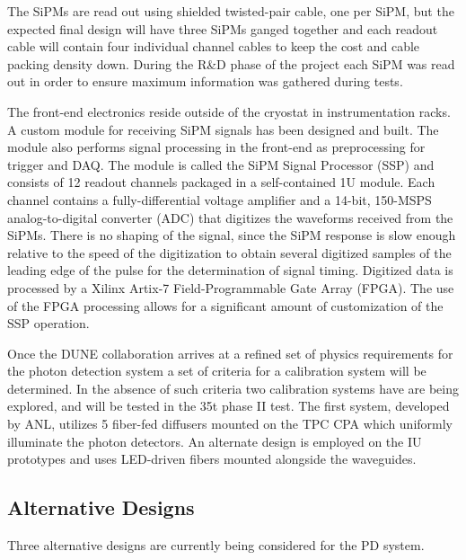 The SiPMs are read out using shielded twisted-pair cable, one per SiPM,
but the expected final design will have three SiPMs ganged together and
each readout cable will contain four individual channel cables to keep
the cost and cable packing density down. During the R\&D phase of the
project each SiPM was read out in order to ensure maximum information
was gathered during tests.  

The front-end electronics reside outside of the cryostat in
instrumentation racks. A custom module for receiving SiPM signals has
been designed and built. The module also performs signal processing in
the front-end as preprocessing for trigger and DAQ.  The module is
called the SiPM Signal Processor (SSP) and consists of 12 readout
channels packaged in a self-contained 1U module.  Each channel
contains a fully-differential voltage amplifier and a 14-bit, 150-MSPS
analog-to-digital converter (ADC) that digitizes the waveforms
received from the SiPMs. There is no shaping of the signal, since the
SiPM response is slow enough relative to the speed of the digitization
to obtain several digitized samples of the leading edge of the pulse
for the determination of signal timing. Digitized data is processed by
a Xilinx Artix-7 Field-Programmable Gate Array (FPGA).  The use of the
FPGA processing allows for a significant amount of customization of
the SSP operation. 

Once the DUNE collaboration arrives at a refined set of physics
requirements for the photon detection system a set of criteria for a
calibration system will be determined. In the absence of such criteria
two calibration systems have are being explored, and will be tested in
the 35t phase II test. The first system, developed by ANL, utilizes 5
fiber-fed diffusers mounted on the TPC CPA which uniformly illuminate
the photon detectors. An alternate design is employed on the IU
prototypes and uses LED-driven fibers mounted alongside the
waveguides. 

\subsection{Alternative Designs} 

Three alternative designs are currently being considered for the PD
system.

